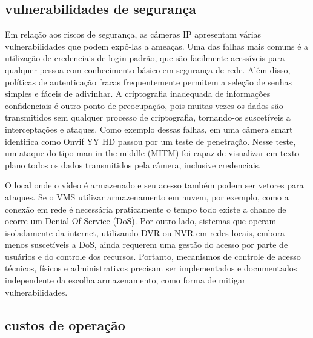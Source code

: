 \documentclass[12pt, %
openright, 
oneside, %
a4paper,    %
brazil]{facom-ufu-abntex2}
\begin{document}
\subsection{vulnerabilidades de segurança}

Em relação aos riscos de segurança, as câmeras IP apresentam várias
vulnerabilidades que podem expô-las a ameaças. Uma das falhas mais comuns é a
utilização de credenciais de login padrão, que são facilmente acessíveis para
qualquer pessoa com conhecimento básico em segurança de rede. Além disso,
políticas de autenticação fracas frequentemente permitem a seleção de senhas
simples e fáceis de adivinhar. A criptografia inadequada de informações
confidenciais é outro ponto de preocupação, pois muitas vezes os dados são
transmitidos sem qualquer processo de criptografia, tornando-os suscetíveis a
interceptações e ataques. Como exemplo dessas falhas, em \cite{9116392} uma
câmera smart identifica como Onvif YY HD passou por um teste de penetração.
Nesse teste, um ataque do tipo man in the middle (MITM) foi capaz de visualizar
em texto plano todos os dados transmitidos pela câmera, inclusive credenciais.

O local onde o vídeo é armazenado e seu acesso também podem ser vetores para
ataques. Se o VMS utilizar armazenamento em nuvem, por exemplo, como a conexão
em rede é necessária praticamente o tempo todo existe a chance de ocorre um
Denial Of Service (DoS). Por outro lado, sistemas que operam isoladamente da
internet, utilizando DVR ou NVR em redes locais, embora menos suscetíveis a
DoS, ainda requerem uma gestão do acesso por parte de usuários e do controle
dos recursos. Portanto, mecanismos de controle de acesso técnicos, físicos e
administrativos precisam ser implementados e documentados independente da
escolha armazenamento, como forma de mitigar vulnerabilidades.

\subsection{custos de operação}



\end{document}
